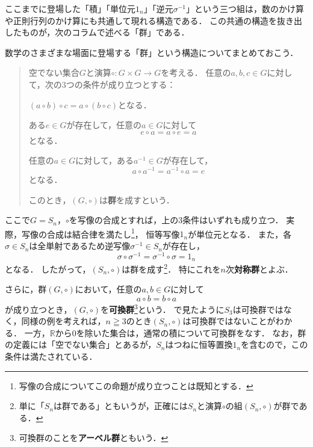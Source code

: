 ここまでに登場した「積」「単位元$1_n$」「逆元$\sigma^{-1}$」という三つ組は，数のかけ算や正則行列のかけ算にも共通して現れる構造である．
この共通の構造を抜き出したものが，次のコラムで述べる「群」である．


\begin{mycolumn}
  数学のさまざまな場面に登場する「群」という構造についてまとめておこう．

  \begin{quotation}
    空でない集合$G$と演算$\circ \colon G \times G \to G$を考える．
    任意の$a,b,c \in G$に対して，次の3つの条件が成り立つとする：
    \begin{description}[align=left,labelwidth=6em]
      \item[結合律] $(a \circ b) \circ c = a \circ (b \circ c)$となる．

      \item[単位元の存在] ある$e \in G$が存在して，任意の$a \in G$に対して
      \[
        e \circ a = a \circ e = a
      \]
      となる．

      \item[逆元の存在] 任意の$a \in G$に対して，ある$a^{-1} \in G$が存在して，
      \[
        a \circ a^{-1} = a^{-1} \circ a = e
      \]
      となる．
    \end{description}
    このとき，$(G,\circ)$は\textbf{群}を成すという．
  \end{quotation}

  ここで$G=S_n$，$\circ$を写像の合成とすれば，上の3条件はいずれも成り立つ．
  実際，写像の合成は結合律を満たし\footnote{写像の合成についてこの命題が成り立つことは既知とする．}，
  恒等写像$1_n$が単位元となる．
  また，各$\sigma \in S_n$は全単射であるため逆写像$\sigma^{-1} \in S_n$が存在し，
  \[
    \sigma \circ \sigma^{-1}
    = \sigma^{-1} \circ \sigma
    = 1_n
  \]
  となる．
  したがって，$(S_n,\circ)$は群を成す\footnote{単に「$S_n$は群である」ともいうが，正確には$S_n$と演算$\circ$の組$(S_n,\circ)$が群である．}．
  特にこれを$n$次\textbf{対称群}とよぶ．

  さらに，群$(G,\circ)$において，任意の$a,b \in G$に対して
  \[
    a \circ b = b \circ a
  \]
  が成り立つとき，$(G,\circ)$を\textbf{可換群}\footnote{可換群のことを\textbf{アーベル群}ともいう．}という．
  で見たように$S_3$は可換群ではなく，同様の例を考えれば，$n \geqq 3$のとき$(S_n,\circ)$は可換群ではないことがわかる．
  一方，$\mathbb{R}$から$0$を除いた集合は，通常の積について可換群をなす．
  なお，群の定義には「空でない集合」とあるが，$S_n$はつねに恒等置換$1_n$を含むので，この条件は満たされている．
\end{mycolumn}

